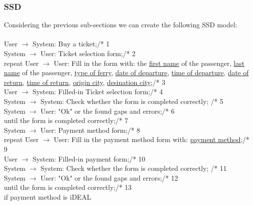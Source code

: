 \subsubsection{SSD}
\creator{\studentA}
Considering the previous sub-sections we can create the following SSD model:\\\\
User $\rightarrow$ System: Buy a ticket;\hfill /* 1\\
System $\rightarrow$ User: Ticket selection form;\hfill /* 2\\
repeat User $\rightarrow$ User: Fill in the form with: the \underline{first name} of the passenger, \underline{last name} of the passenger, \underline{type of ferry}, \underline{date of departure}, \underline{time of departure}, \underline{date of return}, \underline{time of return}, \underline{origin city}, \underline{desination city};\hfill /* 3\\
\phantom{x}\hspace{7mm} User $\rightarrow$ System: Filled-in Ticket selection form;\hfill /* 4\\
\phantom{x}\hspace{7mm} System $\rightarrow$ System: Check whether the form is completed correctly; \hfill /* 5\\
\phantom{x}\hspace{7mm} System $\rightarrow$ User: "Ok" or the found gaps and errors;\hfill /* 6\\
until the form is completed correctly;\hfill /* 7\\
System $\rightarrow$ User: Payment method form;\hfill /* 8\\
repeat User $\rightarrow$ User: Fill in the payment method form with: \underline{payment method};\hfill /* 9\\
\phantom{x}\hspace{7mm} User $\rightarrow$ System: Filled-in payment form;\hfill /* 10\\
\phantom{x}\hspace{7mm} System $\rightarrow$ System: Check whether the form is completed correctly; \hfill /* 11\\
\phantom{x}\hspace{7mm} System $\rightarrow$ User: "Ok" or the found gaps and errors;\hfill /* 12\\
until the form is completed correctly;\hfill /* 13\\
if payment method is iDEAL\\
